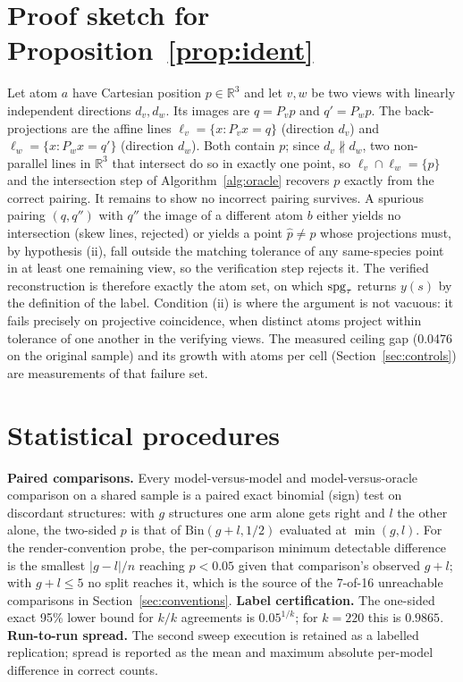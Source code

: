 
\section{Proof sketch for Proposition~\ref{prop:ident}}
\label{app:proof}
Let atom $a$ have Cartesian position $p \in \mathbb{R}^3$ and let $v, w$ be two views with linearly
independent directions $d_v, d_w$. Its images are $q = P_v p$ and $q' = P_w p$. The back-projections are
the affine lines $\ell_v = \{x : P_v x = q\}$ (direction $d_v$) and $\ell_w = \{x : P_w x = q'\}$
(direction $d_w$). Both contain $p$; since $d_v \not\parallel d_w$, two non-parallel lines in
$\mathbb{R}^3$ that intersect do so in exactly one point, so $\ell_v \cap \ell_w = \{p\}$ and the
intersection step of Algorithm~\ref{alg:oracle} recovers $p$ exactly from the correct pairing. It remains
to show no incorrect pairing survives. A spurious pairing $(q, q'')$ with $q''$ the image of a different
atom $b$ either yields no intersection (skew lines, rejected) or yields a point $\hat{p} \neq p$ whose
projections must, by hypothesis (ii), fall outside the matching tolerance of any same-species point in at
least one remaining view, so the verification step rejects it. The verified reconstruction is
therefore exactly the atom set, on which $\mathrm{spg}_\tau$ returns $y(s)$ by the definition of the label. Condition (ii) is where the argument is not vacuous: it fails precisely on projective coincidence, when
distinct atoms project within tolerance of one another in the verifying views. The measured ceiling gap
(0.0476 on the original sample) and its growth with atoms per cell (Section~\ref{sec:controls}) are
measurements of that failure set.


\section{Statistical procedures}
\label{app:stats}
\textbf{Paired comparisons.} Every model-versus-model and model-versus-oracle comparison on a shared sample
is a paired exact binomial (sign) test on discordant structures: with $g$ structures one arm alone gets
right and $l$ the other alone, the two-sided $p$ is that of $\mathrm{Bin}(g+l, 1/2)$ evaluated at
$\min(g,l)$. For the render-convention probe, the per-comparison minimum detectable difference is the
smallest $|g-l|/n$ reaching $p<0.05$ given that comparison's observed $g+l$; with $g+l \le 5$ no split
reaches it, which is the source of the 7-of-16 unreachable comparisons in
Section~\ref{sec:conventions}.
\textbf{Label certification.} The one-sided exact 95\% lower bound for $k/k$ agreements is
$0.05^{1/k}$; for $k = 220$ this is $0.9865$.
\textbf{Run-to-run spread.} The second sweep execution is retained as a labelled replication; spread is
reported as the mean and maximum absolute per-model difference in correct counts.


